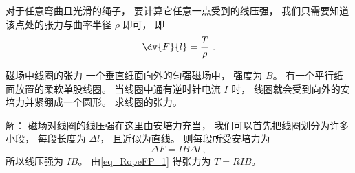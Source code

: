 对于任意弯曲且光滑的绳子， 要计算它任意一点受到的线压强， 我们只需要知道该点处的张力与曲率半径 $\rho$ 即可， 即
\begin{equation}
\dv{F}{l} = \frac{T}{\rho}~.
\end{equation}

\begin{example}{磁场中线圈的张力}
一个垂直纸面向外的匀强磁场中， 强度为 $B$。 有一个平行纸面放置的柔软单股线圈。 当线圈中通有逆时针电流 $I$ 时， 线圈就会受到向外的安培力并紧绷成一个圆形。 求线圈的张力。

解： 磁场对线圈的线压强在这里由安培力充当， 我们可以首先把线圈划分为许多小段， 每段长度为 $\Delta l$， 且近似为直线。 则每段所受安培力为
\begin{equation}
\Delta F = IB\Delta l~,
\end{equation}
所以线压强为 $IB$。 由\autoref{eq_RopeFP_1} 得张力为 $T = RIB$。
\end{example}
